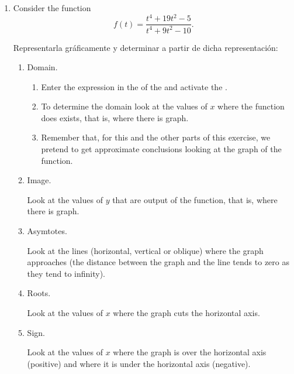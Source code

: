 \begin{enumerate}[leftmargin=*]
\item Consider the function
      \[
      f(t)=\frac{t^{4} +19t^{2} - 5}{t^{4} +9t^{2} - 10}.
      \]

      Representarla gráficamente y determinar a partir de dicha representación:

      \begin{enumerate}
      \item  Domain.
            \begin{indication}
            \begin{enumerate}
            \item Enter the expression  in the  of the  and activate the .
            \item To determine the domain look at the values of $x$ where the function does exists, that is, where there is graph.
            \item Remember that, for this and the other parts of this exercise, we pretend to get approximate conclusions looking at the graph of the function.
            \end{enumerate}
            \end{indication}

      \item Image.
            \begin{indication}
            Look at the values of $y$ that are output of the function, that is, where there is graph.
            \end{indication}

      \item Asymtotes.
            \begin{indication}
            Look at the lines (horizontal, vertical or oblique) where the graph approaches (the distance between the graph and the line tends to zero as they tend to infinity).
            \end{indication}

      \item  Roots.
            \begin{indication}
            Look at the values of $x$ where the graph cuts the horizontal axis.
            \end{indication}

      \item Sign.
            \begin{indication}
            Look at the values of $x$ where the graph is over the horizontal axis (positive) and where it is under the horizontal axis (negative).


\end{indication}
\end{enumerate}
\end{enumerate}
